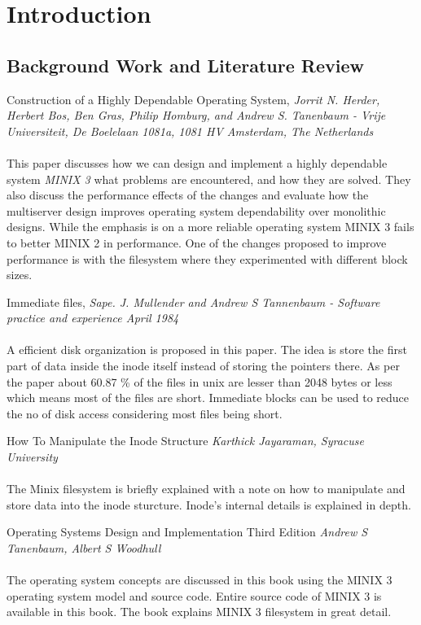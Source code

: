 \chapter{Introduction}

\section{Background Work and Literature Review}
\vspace{10mm}
 Construction of a Highly Dependable Operating System, { \em Jorrit N. Herder, Herbert Bos, Ben Gras, Philip Homburg, and Andrew S. Tanenbaum - Vrije Universiteit, De Boelelaan 1081a, 1081 HV Amsterdam, The Netherlands
}\cite{chdos}
\\
\\
This paper discusses how we can design and implement a highly dependable system { \em MINIX 3} what problems are encountered, and how they are solved. They also discuss the performance effects of the changes and evaluate how the multiserver design improves operating system dependability over monolithic designs. While the emphasis is on a more reliable operating system MINIX 3 fails to better MINIX 2 in performance. One of the changes proposed to improve performance is with the filesystem where they experimented with different block sizes.

\vspace{10mm}

Immediate files, { \em  Sape. J. Mullender and Andrew S Tannenbaum - Software practice and experience April 1984 }\cite{astimme}
\\
\\
A efficient disk organization is proposed in this paper. The idea is store the first part of data inside the inode itself instead of storing the pointers there. As per the paper about 60.87 \% of the files in unix are lesser than 2048 bytes or less which means most of the files are short. Immediate blocks can be used to reduce the no of disk access considering most files being short.

\pagebreak
How To Manipulate the Inode Structure  { \em Karthick Jayaraman, Syracuse University } \cite{inode}
\\ 
\\
The Minix filesystem is briefly explained with a note on how to manipulate and store data into the inode sturcture. Inode's internal details is explained in depth.

\vspace{10mm}

Operating Systems Design and Implementation Third Edition { \em Andrew S Tanenbaum, Albert S Woodhull }
\\
\\
The operating system concepts are discussed in this book using the MINIX 3 operating system model and source code. Entire source code of MINIX 3 is available in this book. The book explains MINIX 3 filesystem in great detail. 



